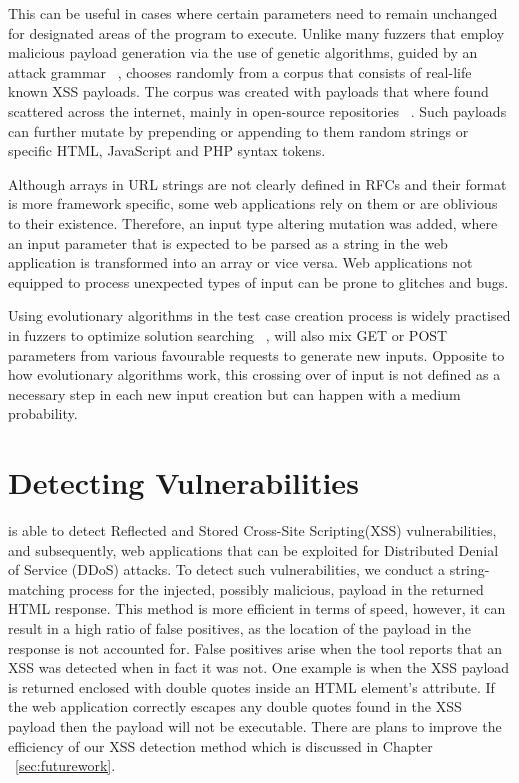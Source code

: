 This can be useful in cases where certain parameters need to remain unchanged for designated areas of the program to execute. Unlike many fuzzers that employ malicious payload generation via the use of genetic algorithms, guided by an attack grammar ~\cite{duchene2014kameleonfuzz}, \pname{} chooses randomly from a corpus that consists of real-life known XSS payloads. The corpus was created with payloads that where found scattered across the internet, mainly in open-source repositories ~\cite{seclist,xsspayloadfirst,xsspayloadsecond}. Such payloads can further mutate by prepending or appending to them random strings or specific HTML, JavaScript and PHP syntax tokens.

Although arrays in URL strings are not clearly defined in RFCs and their format is more framework specific, some web applications rely on them or are oblivious to their existence. Therefore, an input type altering mutation was added, where an input parameter that is
expected to be parsed as a string in the web application is transformed into an array or vice versa. Web applications not equipped to process unexpected types of input can be prone to glitches and bugs.

Using evolutionary algorithms in the test case creation process is widely practised in fuzzers
to optimize solution searching ~\cite{seal2016Genetic}, \pname{} will also mix GET or POST parameters from various favourable requests to generate new inputs. Opposite to how evolutionary algorithms work, this crossing over of input is not defined as a necessary step in each new input creation but can happen with a medium probability.

\section{Detecting Vulnerabilities}
\pname{} is able to detect Reflected and Stored Cross-Site Scripting(XSS) vulnerabilities, and subsequently, web applications that can be exploited for Distributed Denial of Service (DDoS) attacks. To detect such vulnerabilities, we conduct a string-matching process for the injected, possibly malicious, payload in the returned HTML response. This method is more efficient in terms of speed, however, it can result in a high ratio of false positives, as the location of the payload in the response is not accounted for. False positives arise when the tool reports that an XSS was detected when in fact it was not. One example is when the XSS payload is returned enclosed with double quotes inside an HTML element's attribute. If the web application correctly escapes any double quotes found in the XSS payload then the payload will not be executable. There are plans to improve the efficiency of our XSS detection method which is discussed in Chapter ~\ref{sec:futurework}.
